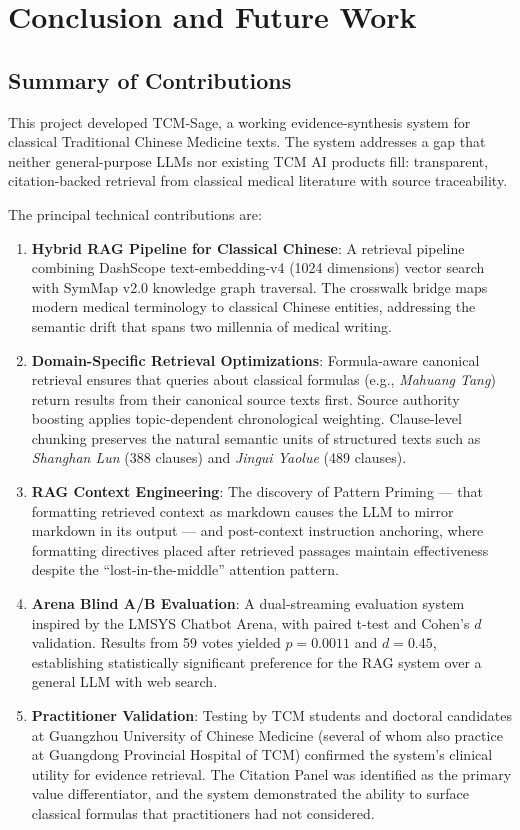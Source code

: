 \chapter{Conclusion and Future Work}

\section{Summary of Contributions}

This project developed TCM-Sage, a working evidence-synthesis system for classical Traditional Chinese Medicine texts. The system addresses a gap that neither general-purpose LLMs nor existing TCM AI products fill: transparent, citation-backed retrieval from classical medical literature with source traceability.

The principal technical contributions are:

\begin{enumerate}
    \item \textbf{Hybrid RAG Pipeline for Classical Chinese}: A retrieval pipeline combining DashScope text-embedding-v4 (1024 dimensions) vector search with SymMap v2.0 knowledge graph traversal. The crosswalk bridge maps modern medical terminology to classical Chinese entities, addressing the semantic drift that spans two millennia of medical writing.

    \item \textbf{Domain-Specific Retrieval Optimizations}: Formula-aware canonical retrieval ensures that queries about classical formulas (e.g., \textit{Mahuang Tang}) return results from their canonical source texts first. Source authority boosting applies topic-dependent chronological weighting. Clause-level chunking preserves the natural semantic units of structured texts such as \textit{Shanghan Lun} (388 clauses) and \textit{Jingui Yaolue} (489 clauses).

    \item \textbf{RAG Context Engineering}: The discovery of Pattern Priming --- that formatting retrieved context as markdown causes the LLM to mirror markdown in its output --- and post-context instruction anchoring, where formatting directives placed after retrieved passages maintain effectiveness despite the ``lost-in-the-middle'' attention pattern.

    \item \textbf{Arena Blind A/B Evaluation}: A dual-streaming evaluation system inspired by the LMSYS Chatbot Arena, with paired t-test and Cohen's $d$ validation. Results from 59 votes yielded $p = 0.0011$ and $d = 0.45$, establishing statistically significant preference for the RAG system over a general LLM with web search.

    \item \textbf{Practitioner Validation}: Testing by TCM students and doctoral candidates at Guangzhou University of Chinese Medicine (several of whom also practice at Guangdong Provincial Hospital of TCM) confirmed the system's clinical utility for evidence retrieval. The Citation Panel was identified as the primary value differentiator, and the system demonstrated the ability to surface classical formulas that practitioners had not considered.
\end{enumerate}

